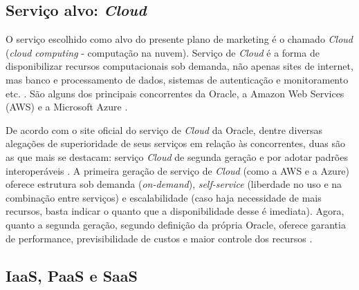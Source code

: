 \documentclass[a4paper]{article}
\begin{document}
\subsection{Serviço alvo: \emph{Cloud}}

O serviço escolhido como alvo do presente plano de marketing é o chamado \emph{Cloud} (\emph{cloud computing} - computação na nuvem). Serviço de \emph{Cloud} é a forma de disponibilizar recursos computacionais sob demanda, não apenas sites de internet, mas banco e processamento de dados, sistemas de autenticação e monitoramento etc. \cite{Computa60:online}. São alguns dos principais concorrentes da Oracle, a Amazon Web Services (AWS) \cite{AmazonWe34:online} e a Microsoft Azure \cite{Microsoft12:online}. 

De acordo com o site oficial do serviço de \emph{Cloud} da Oracle, dentre diversas alegações de superioridade de seus serviços em relação às concorrentes, duas são as que mais se destacam: serviço \emph{Cloud} de segunda geração e por adotar padrões interoperáveis \cite{CloudInf85:online}. A primeira geração de serviço de \emph{Cloud} (como a AWS e a Azure) oferece estrutura sob demanda (\emph{on-demand}), \emph{self-service} (liberdade no uso e na combinação entre serviços) e escalabilidade (caso haja necessidade de mais recursos, basta indicar o quanto que a disponibilidade desse é imediata). Agora, quanto a segunda geração, segundo definição da própria Oracle, oferece garantia de performance, previsibilidade de custos e maior controle dos recursos \cite{1WhytheW34:online}. 

\subsection{IaaS, PaaS e SaaS}
\end{document}
